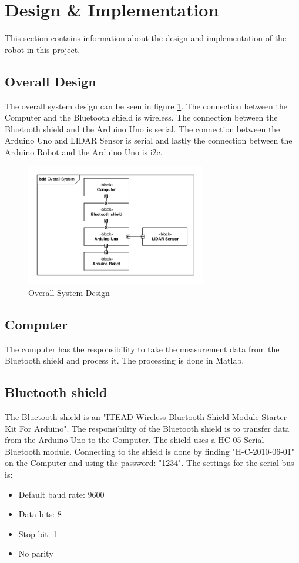 \section{Design \& Implementation}
This section contains information about the design and implementation of the robot in this project.

\subsection{Overall Design}
The overall system design can be seen in figure \ref{fig:OSD}. The connection between the Computer and the Bluetooth shield is wireless. The connection between the Bluetooth shield and the Arduino Uno is serial. The connection between the Arduino Uno and LIDAR Sensor is serial and lastly the connection between the Arduino Robot and the Arduino Uno is i2c.
\begin{figure}[H]
\centering
\includegraphics[width=0.7\textwidth]{billeder/OverallSystemDesign}
\caption{Overall System Design}
\label{fig:OSD}
\end{figure}

\subsection{Computer}
The computer has the responsibility to take the measurement data from the Bluetooth shield and process it. The processing is done in Matlab. 

\subsection{Bluetooth shield}
The Bluetooth shield is an "ITEAD Wireless Bluetooth Shield Module Starter Kit For Arduino"\cite{BTshield}\cite{BTshield2}. The responsibility of the Bluetooth shield is to transfer data from the Arduino Uno to the Computer. The shield uses a HC-05 Serial Bluetooth module. Connecting to the shield is done by finding "H-C-2010-06-01" on the Computer and using the password: "1234". The settings for the serial bus is:
\begin{itemize}
\item Default baud rate: 9600
\item Data bits: 8
\item Stop bit: 1
\item No parity
\end{itemize}


